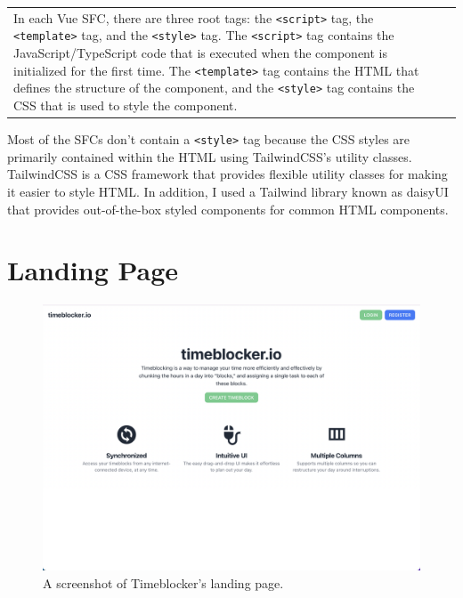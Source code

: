 \documentclass[notitlepage, 12pt]{report}
\newcommand{\code}[1]{\texttt{#1}}
\begin{document}
\noindent\begin{xltabular}{\textwidth}{
		@{}
		X
		p{0.6\textwidth}
		@{}
	}
	In each Vue SFC, there are three root tags: the \code{<script>} tag, the \code{<template>} tag, and the \code{<style>} tag. The \code{<script>} tag contains the JavaScript/TypeScript code that is executed when the component is initialized for the first time. The \code{<template>} tag contains the HTML that defines the structure of the component, and the \code{<style>} tag contains the CSS that is used to style the component.
	&
	\centerline{}
\end{xltabular}

Most of the SFCs don't contain a \code{<style>} tag because the CSS styles are primarily contained within the HTML using TailwindCSS's utility classes. TailwindCSS is a CSS framework that provides flexible utility classes for making it easier to style HTML. In addition, I used a Tailwind library known as daisyUI that provides out-of-the-box styled components for common HTML components.

\section*{Landing Page}

\begin{figure}[H]
	\caption{A screenshot of Timeblocker's landing page.}
	\includegraphics[width=\textwidth]{frontend-landing-page.png}
\end{figure}
\end{document}
